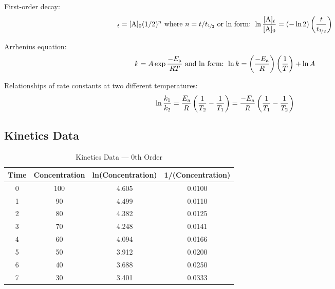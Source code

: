 \documentclass[10pt]{article}
\begin{document}
First-order decay:
\begin{equation*}
[\textnormal{A}]_t = [\textnormal{A}]_0 (1/2)^n \textnormal{ where } n = t/t_{\nicefrac{1}{2}}
\textnormal{ or ln form: } 
\ln\frac{[\textnormal{A}]_t}{[\textnormal{A}]_0} = (-\ln 2)\left(\frac{t}{t_{\nicefrac{1}{2}}}\right) 
\end{equation*}

Arrhenius equation:
\begin{equation*}
k = A \exp{\frac{-E_\textnormal{a}}{RT}} \textnormal{ and ln form: } \ln k = \left(\frac{-E_\textnormal{a}}{R}\right)\left(\frac{1}{T}\right) + \ln A
\end{equation*}

Relationships of rate constants at two different temperatures:
\begin{equation*}
\ln \frac{k_1}{k_2} = \frac{E_\textnormal{a}}{R}\left(\frac{1}{T_2} - \frac{1}{T_1}\right) = \frac{-E_\textnormal{a}}{R}\left(\frac{1}{T_1}-\frac{1}{T_2}\right)
\end{equation*}

\subsection{Kinetics Data}

\begin{table}[htbp]
    \centering
    \caption{Kinetics Data --- 0th Order}
        \begin{tabular}{cccc}
            \toprule
                Time & Concentration & ln(Concentration) & 1/(Concentration) \\
                \midrule
                0     & 100   & 4.605 & 0.0100 \\
                1     & 90    & 4.499 & 0.0110 \\
                2     & 80    & 4.382 & 0.0125 \\
                3     & 70    & 4.248 & 0.0141 \\
                4     & 60    & 4.094 & 0.0166 \\
                5     & 50    & 3.912 & 0.0200 \\
                6     & 40    & 3.688 & 0.0250 \\
                7     & 30    & 3.401 & 0.0333 \\
            \bottomrule
        \end{tabular}
\end{table}
\vspace*{-.5cm}    
{\centering\\[-3.5ex]
\\[-3.5ex]
\\}
\end{document}
